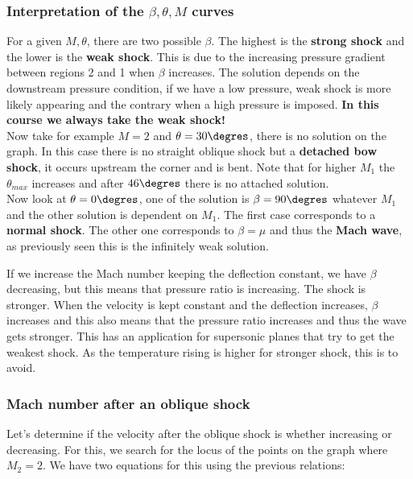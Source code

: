 \subsubsection{Interpretation of the $\beta, \theta, M$ curves}
	For a given $M, \theta$, there are two possible $\beta$. The highest is the \textbf{strong shock} and the lower is the \textbf{weak shock}. This is due to the increasing pressure gradient between regions 2 and 1 when $\beta$ increases. The solution depends on the downstream pressure condition, if we have a low pressure, weak shock is more likely appearing and the contrary when a high pressure is imposed. \textbf{In this course we always take the weak shock!} \\
	
	Now take for example $M=2$ and $\theta = 30\degres$, there is no solution on the graph. In this case there is no straight oblique shock but a \textbf{detached bow shock}, it occurs upstream the corner and is bent.  Note that for higher $M_1$ the $\theta _{max}$ increases and after $46\degres$ there is no attached solution. \\
	
	Now look at $\theta = 0\degres$, one of the solution is $\beta = 90\degres$ whatever $M_1$ and the other solution is dependent on $M_1$. The first case corresponds to a \textbf{normal shock}. The other one corresponds to $\beta = \mu$ and thus the \textbf{Mach wave}, as previously seen this is the infinitely weak solution.
	
	If we increase the Mach number keeping the deflection constant, we have $\beta$ decreasing, but this means that pressure ratio is increasing. The shock is stronger. When the velocity is kept constant and the deflection increases, $\beta$ increases and this also means that the pressure ratio increases and thus the wave gets stronger. This has an application for supersonic planes that try to get the weakest shock. As the temperature rising is higher for stronger shock, this is to avoid. 
	
\subsubsection{Mach number after an oblique shock}
	Let's determine if the velocity after the oblique shock is whether increasing or decreasing. For this, we search for the locus of the points on the graph where $M_2 = 2$. We have two equations for this using the previous relations: 
	
